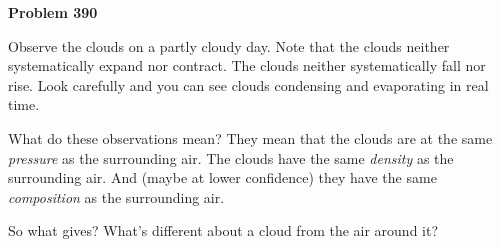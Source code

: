 \documentclass[12pt]{article}
\begin{document}
\begin{pottproblem}
\textbf{Problem 390}

Observe the clouds on a partly cloudy day.
Note that the clouds neither systematically expand nor contract.
The clouds neither systematically fall nor rise.
Look carefully and you can see clouds condensing and evaporating in real time.

What do these observations mean?
They mean that the clouds are at the same \emph{pressure} as the surrounding air.
The clouds have the same \emph{density} as the surrounding air.
And (maybe at lower confidence) they have the same \emph{composition} as the surrounding air.

So what gives? What's different about a cloud from the air around it?

\end{pottproblem}
\end{document}
